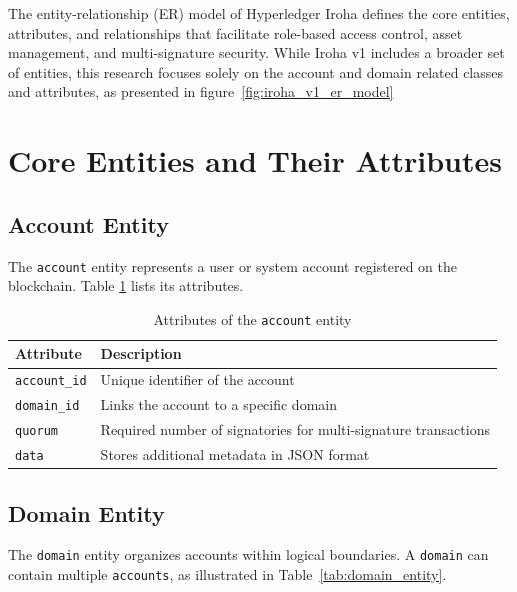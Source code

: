 \documentclass[final]{rc-book-2.14}
\begin{document}
The entity-relationship (ER) model of Hyperledger Iroha defines the core entities, attributes, and relationships that facilitate role-based access control, asset management, and multi-signature security. While Iroha v1 includes a broader set of entities, this research focuses solely on the account and domain related classes and attributes, as presented in figure~\ref{fig:iroha_v1_er_model}

\section{Core Entities and Their Attributes}
\subsection{Account Entity}
The \texttt{account} entity represents a user or system account registered on the blockchain. Table \ref{tab:account_entity} lists its attributes.

\begin{table}[h]
    \centering
    \renewcommand{\arraystretch}{1.2}
    \caption{Attributes of the \texttt{account} entity}
    \label{tab:account_entity}
    \begin{tabularx}{\textwidth}{|l|X|}
        \hline
        \textbf{Attribute}   & \textbf{Description}                                            \\ \hline
        \texttt{account\_id} & Unique identifier of the account                                \\ \hline
        \texttt{domain\_id}  & Links the account to a specific domain                          \\ \hline
        \texttt{quorum}      & Required number of signatories for multi-signature transactions \\ \hline
        \texttt{data}        & Stores additional metadata in JSON format                       \\ \hline
    \end{tabularx}
\end{table}


\subsection{Domain Entity}
The \texttt{domain} entity organizes accounts within logical boundaries. A \texttt{domain} can contain multiple \texttt{accounts}, as illustrated in Table~\ref{tab:domain_entity}.
\end{document}
